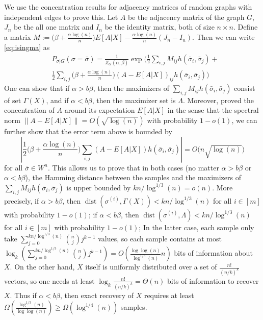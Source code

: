 \label{key}\documentclass[conference]{IEEEtran}
\DeclareMathOperator{\dist}{dist}
\begin{document}
We use the concentration results for adjacency matrices of random graphs with independent edges to prove this.
Let $A$ be the adjacency matrix of the graph $G$, $J_n$ be the all one matrix and $I_n$ be the identity matrix, both of size $n\times n$.
Define a matrix
$
M:= \big(\beta+\frac{\alpha\log(n)}{n} \big) E[A|X]
-\frac{\alpha\log(n)}{n} (J_n-I_n).
$
Then we can write \eqref{eq:isingma}
as
\begin{align*}
&P_{\sigma|G}(\sigma=\bar{\sigma})
= \frac{1}{Z_G(\alpha,\beta)}
\exp\Big( \frac{1}{2} \sum_{i,j} M_{ij} h(\bar{\sigma}_i, \bar{\sigma}_j) + \\
& \frac{1}{2} \sum_{i,j}\big(\beta+\frac{\alpha\log(n)}{n} \big)  (A-E[A|X])_{ij} h(\bar{\sigma}_i, \bar{\sigma}_j) 
\Big)
\end{align*}
One can show that if $\alpha>b\beta$, then the maximizers of $\sum_{i,j} M_{ij} h(\bar{\sigma}_i, \bar{\sigma}_j)$ consist of set $\Gamma(X)$, and if $\alpha<b\beta$, then the maximizer set is $\Lambda$.
Moreover, \cite{Hajek16} proved the concentration of $A$ around its expectation $E[A|X]$ in the sense that
the spectral norm $\|A-E[A|X]\| = O(\sqrt{\log(n)})$ with probability $1-o(1)$, we can further show that the error term above is bounded by
$$
\left|\frac{1}{2} \big(\beta+\frac{\alpha\log(n)}{n} \big)\sum_{i,j} (A-E[A|X])
 h( \bar{\sigma}_i, \bar{\sigma}_j) \right| = O \big( n \sqrt{\log(n)} \big)
$$
for all $\bar{\sigma}\in W^n$.
This allows us to prove that in both cases (no matter $\alpha>b\beta$ or $\alpha<b\beta$), the Hamming distance between the samples and the maximizers of $\sum_{i,j}  M_{ij}h(\bar{\sigma}_i, \bar{\sigma}_j)$ is upper bounded by $kn/\log^{1/3}(n)=o(n)$.
More precisely, if $\alpha>b\beta$, then $\dist(\sigma^{(i)},\Gamma(X) )< kn/\log^{1/3}(n)$ for all $i\in[m]$ with probability $1-o(1)$;
if $\alpha<b\beta$, then $\dist(\sigma^{(i)}, \Lambda)< kn/\log^{1/3}(n)$ for all $i\in[m]$ with probability $1-o(1)$;
In the latter case, each sample only take $\sum_{j=0}^{kn/\log^{1/3}(n)}\binom{n}{j}j^{k-1}$ values, so each sample contains at most $\log_k(\sum_{j=0}^{kn/\log^{1/3}(n)}\binom{n}{j}j^{k-1})=O(\frac{\log\log(n)}{\log^{1/3}(n)} n)$ bits of information about $X$. On the other hand, $X$ itself is uniformly distributed over a set of $\frac{n!}{(n/k)^k}$ vectors, so one needs at least $\log_k\frac{n!}{(n/k)^k}=\Theta(n)$ bits of information to recover $X$. Thus if $\alpha<b\beta$, then exact recovery of $X$ requires at least $\Omega(\frac{\log^{1/3}(n)}{\log\log(n)})\ge \Omega(\log^{1/4}(n))$ samples.
\end{document}
